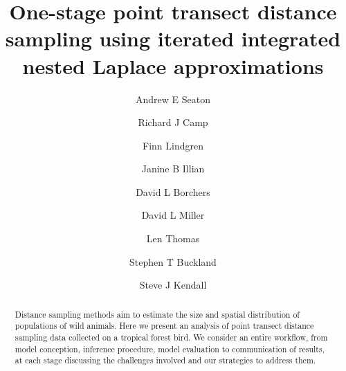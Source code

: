 \documentclass[preprint,12pt]{elsarticle}
\newcommand{\hawaii}{Hawai\textquotesingle i}   %
\begin{document}
\begin{frontmatter}
\title{One-stage point transect distance sampling using iterated integrated nested Laplace approximations}




\author[1,*]{Andrew E Seaton}
\author[1,2]{Richard J Camp}
\author[3]{Finn Lindgren}
\author[1]{Janine B Illian}
\author[1]{David L Borchers}
\author[1]{David L Miller}      %
\author[1]{Len Thomas}          %
\author[1]{Stephen T Buckland}  %
\author[4]{Steve J Kendall}     %

\address[1]{Centre for Research into Ecological \& Environmental Modelling and School of Mathematics \& Statistics, University of St Andrews, St Andrews, Fife, Scotland}
\address[2]{U. S. Geological Survey, Pacific Island Ecosystems Research Center, P.O. Box 44, \hawaii{} National Park, HI 96718, U.S.A.}
\address[3]{School of Mathematics, University of Edinburgh, Edinburgh, Scotland}
\address[4]{U. S. Fish and Wildlife, Big Island National Wildlife Refuge Complex, 60 Nowelo St., Suite 100, Hilo, HI  96720, U.S.A.}
\address[*]{Correspondence: Andrew E Seaton, Email: aes22@st-andrews.ac.uk}

\begin{abstract}
Distance sampling methods aim to estimate the size and spatial distribution of populations of wild animals.  Here we present an analysis of point transect distance sampling data collected on a tropical forest bird.  We consider an entire workflow, from model conception, inference procedure, model evaluation to communication of results, at each stage discussing the challenges involved and our strategies to address them.  


\end{abstract}
\end{frontmatter}
\end{document}

